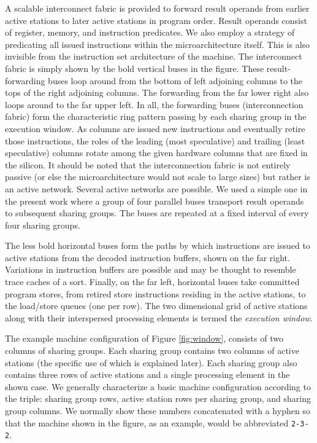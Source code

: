 \documentclass[10pt,dvips]{article}
\begin{document}
A scalable interconnect fabric 
is provided to forward result
operands from earlier active stations to later active stations in
program order.  Result operands consist of register, memory, and
instruction predicates.  We also employ a strategy of predicating all
issued instructions within the microarchitecture itself.  This is also 
invisible from the instruction set architecture of the machine.
The interconnect fabric is simply shown by
the bold vertical buses in the figure.  These result-forwarding buses
loop around from the bottom of left adjoining columns to the tops of
the right adjoining columns.  The forwarding from the far lower right
also loops around to the far upper left.  In all, the forwarding
buses (interconnection fabric) form the characteristic ring pattern
passing by each sharing group in the execution window.
As columns are issued new instructions and eventually retire
those instructions, the roles of the leading 
(most speculative) and trailing (least
speculative) columns rotate among the given hardware columns that
are fixed in the silicon.
It should be noted that the interconnection fabric is not
entirely passive (or else the microarchitecture would not
scale to large sizes) but rather is an active network.
Several active networks are possible.  We used a simple one
in the present work where a group of four parallel buses transport
result operands to subsequent sharing groups.  The buses are repeated
at a fixed interval of every four sharing groups.

The less bold horizontal buses
form the paths by which instructions are issued to active stations
from the decoded instruction buffers, shown on the far right.
Variations in instruction buffers are possible and may be thought
to resemble trace caches of a sort.
Finally, on the far left, horizontal buses take committed program
stores, from retired store instructions residing in the active stations,
to the load/store queues (one per row).
The two dimensional
grid of active stations along with their interspersed processing elements
is termed the \textit{execution window}.


The example 
machine configuration
of Figure \ref{fig:window}, 
consists of 
two columns of sharing groups.  Each sharing group contains two columns of
active stations (the specific use of which is explained later).
Each sharing group also contains three rows of active stations
and a single processing element in the shown case.  
We generally characterize
a basic machine configuration according to the triple: sharing group
rows, active station
rows per sharing group, and sharing group columns.  We normally
show these numbers concatenated with a hyphen so that the machine shown
in the figure, as an example, would be abbreviated {\tt 2-3-2}.
\end{document}
